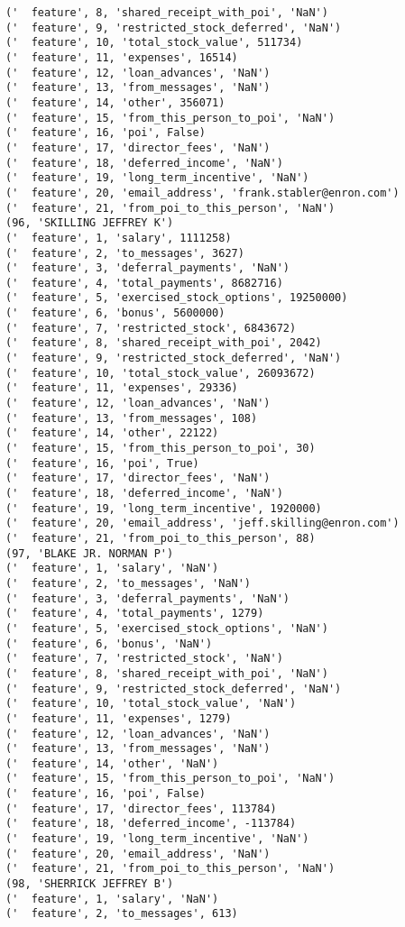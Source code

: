 \begin{verbatim}
('  feature', 8, 'shared_receipt_with_poi', 'NaN')
('  feature', 9, 'restricted_stock_deferred', 'NaN')
('  feature', 10, 'total_stock_value', 511734)
('  feature', 11, 'expenses', 16514)
('  feature', 12, 'loan_advances', 'NaN')
('  feature', 13, 'from_messages', 'NaN')
('  feature', 14, 'other', 356071)
('  feature', 15, 'from_this_person_to_poi', 'NaN')
('  feature', 16, 'poi', False)
('  feature', 17, 'director_fees', 'NaN')
('  feature', 18, 'deferred_income', 'NaN')
('  feature', 19, 'long_term_incentive', 'NaN')
('  feature', 20, 'email_address', 'frank.stabler@enron.com')
('  feature', 21, 'from_poi_to_this_person', 'NaN')
(96, 'SKILLING JEFFREY K')
('  feature', 1, 'salary', 1111258)
('  feature', 2, 'to_messages', 3627)
('  feature', 3, 'deferral_payments', 'NaN')
('  feature', 4, 'total_payments', 8682716)
('  feature', 5, 'exercised_stock_options', 19250000)
('  feature', 6, 'bonus', 5600000)
('  feature', 7, 'restricted_stock', 6843672)
('  feature', 8, 'shared_receipt_with_poi', 2042)
('  feature', 9, 'restricted_stock_deferred', 'NaN')
('  feature', 10, 'total_stock_value', 26093672)
('  feature', 11, 'expenses', 29336)
('  feature', 12, 'loan_advances', 'NaN')
('  feature', 13, 'from_messages', 108)
('  feature', 14, 'other', 22122)
('  feature', 15, 'from_this_person_to_poi', 30)
('  feature', 16, 'poi', True)
('  feature', 17, 'director_fees', 'NaN')
('  feature', 18, 'deferred_income', 'NaN')
('  feature', 19, 'long_term_incentive', 1920000)
('  feature', 20, 'email_address', 'jeff.skilling@enron.com')
('  feature', 21, 'from_poi_to_this_person', 88)
(97, 'BLAKE JR. NORMAN P')
('  feature', 1, 'salary', 'NaN')
('  feature', 2, 'to_messages', 'NaN')
('  feature', 3, 'deferral_payments', 'NaN')
('  feature', 4, 'total_payments', 1279)
('  feature', 5, 'exercised_stock_options', 'NaN')
('  feature', 6, 'bonus', 'NaN')
('  feature', 7, 'restricted_stock', 'NaN')
('  feature', 8, 'shared_receipt_with_poi', 'NaN')
('  feature', 9, 'restricted_stock_deferred', 'NaN')
('  feature', 10, 'total_stock_value', 'NaN')
('  feature', 11, 'expenses', 1279)
('  feature', 12, 'loan_advances', 'NaN')
('  feature', 13, 'from_messages', 'NaN')
('  feature', 14, 'other', 'NaN')
('  feature', 15, 'from_this_person_to_poi', 'NaN')
('  feature', 16, 'poi', False)
('  feature', 17, 'director_fees', 113784)
('  feature', 18, 'deferred_income', -113784)
('  feature', 19, 'long_term_incentive', 'NaN')
('  feature', 20, 'email_address', 'NaN')
('  feature', 21, 'from_poi_to_this_person', 'NaN')
(98, 'SHERRICK JEFFREY B')
('  feature', 1, 'salary', 'NaN')
('  feature', 2, 'to_messages', 613)

\end{verbatim}
